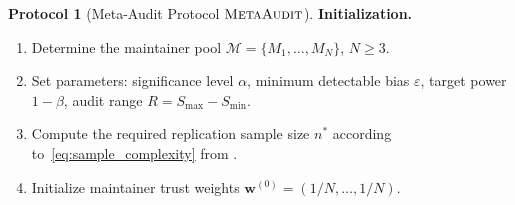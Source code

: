 \documentclass[11pt,a4paper]{article}
\theoremstyle{definition}
\newtheorem{protocol}[theorem]{Protocol}
\newcommand{\MetaAudit}{\textsc{MetaAudit}}
\begin{document}
\begin{protocol}[Meta-Audit Protocol $\MetaAudit$]
\label{prot:meta_audit}
\textbf{Initialization.}
\begin{enumerate}[leftmargin=*, label=\textbf{I\arabic*}]
    \item Determine the maintainer pool $\mathcal{M} = \{M_1, \ldots, M_N\}$, $N \geq 3$.
    \item Set parameters: significance level $\alpha$, minimum detectable bias $\varepsilon$, target power $1-\beta$, audit range $R = S_{\max} - S_{\min}$.
    \item Compute the required replication sample size $n^*$ according to~\eqref{eq:sample_complexity} from .
    \item Initialize maintainer trust weights $\mathbf{w}^{(0)} = (1/N, \ldots, 1/N)$.
\end{enumerate}


\end{protocol}
\end{document}
